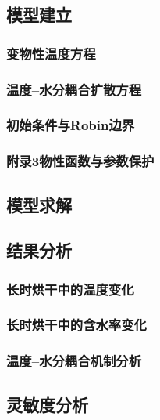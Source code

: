 \documentclass[withoutpreface,bwprint]{cumcmthesis}
\begin{document}

\subsection{模型建立}

\subsubsection{变物性温度方程}
\subsubsection{温度--水分耦合扩散方程}
\subsubsection{初始条件与Robin边界}
\subsubsection{附录3物性函数与参数保护}

\subsection{模型求解}


\subsection{结果分析}

\subsubsection{长时烘干中的温度变化}
\subsubsection{长时烘干中的含水率变化}
\subsubsection{温度--水分耦合机制分析}

\subsection{灵敏度分析}

\end{document}
